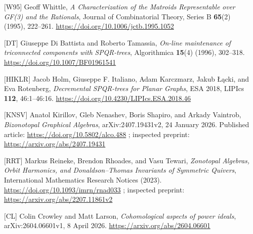 \documentclass[11pt]{article}
\begin{document}
[W95] Geoff Whittle, \emph{A Characterization of the Matroids Representable over GF(3) and the Rationals}, Journal of Combinatorial Theory, Series B \textbf{65}(2) (1995), 222--261. \url{https://doi.org/10.1006/jctb.1995.1052}

[DT] Giuseppe Di Battista and Roberto Tamassia, \emph{On-line maintenance of triconnected components with SPQR-trees}, Algorithmica \textbf{15}(4) (1996), 302--318. \url{https://doi.org/10.1007/BF01961541}

[HIKLR] Jacob Holm, Giuseppe F. Italiano, Adam Karczmarz, Jakub \L{}\k{a}cki, and Eva Rotenberg, \emph{Decremental SPQR-trees for Planar Graphs}, ESA 2018, LIPIcs \textbf{112}, 46:1--46:16. \url{https://doi.org/10.4230/LIPIcs.ESA.2018.46}

[KNSV] Anatol Kirillov, Gleb Nenashev, Boris Shapiro, and Arkady Vaintrob, \emph{Bizonotopal Graphical Algebras}, arXiv:2407.19431v2, 24 January 2026. Published article: \url{https://doi.org/10.5802/alco.488} ; inspected preprint: \url{https://arxiv.org/abs/2407.19431}

[RRT] Markus Reineke, Brendon Rhoades, and Vasu Tewari, \emph{Zonotopal Algebras, Orbit Harmonics, and Donaldson--Thomas Invariants of Symmetric Quivers}, International Mathematics Research Notices (2023). \url{https://doi.org/10.1093/imrn/rnad033} ; inspected preprint: \url{https://arxiv.org/abs/2207.11861v2}

[CL] Colin Crowley and Matt Larson, \emph{Cohomological aspects of power ideals}, arXiv:2604.06601v1, 8 April 2026. \url{https://arxiv.org/abs/2604.06601}
\end{document}
